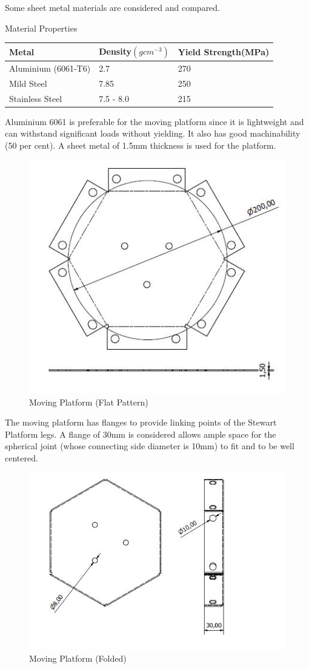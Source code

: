 Some sheet metal materials are considered and compared.
\begin{table}[!h]
	\caption[Sheet Metal Properties]{Material Properties}
\end{table}
\begin{center}
\centering
\begin{tabular}{|l|l|l|}
\hline
\textbf{Metal} & \textbf{Density$(gcm^{-3})$} & \textbf{Yield Strength(MPa)}\\
\hline
Aluminium (6061-T6)& 2.7 & 270\\
\hline
Mild Steel & 7.85 & 250\\
\hline
Stainless Steel & 7.5 - 8.0 & 215\\
\hline
\end{tabular}
\end{center}
Aluminium 6061 is preferable for the moving platform since it is lightweight and can withstand significant loads without yielding. It also has good machinability (50 per cent). A sheet metal of 1.5mm thickness is used for the platform.
\begin{center}
	\begin{figure}[H]
	\centering
	\includegraphics[width=0.6\linewidth]{Figures/Flat}
	\caption[Moving Platform]{Moving Platform (Flat Pattern)}
	\end{figure}
\end{center}

The moving platform has flanges to provide linking points of the Stewart Platform legs. A flange of 30mm is considered allows ample space for the spherical joint (whose connecting side diameter is 10mm) to fit and to be well centered.
\begin{center}
	\begin{figure}[H]
	\centering
	\includegraphics[width=0.6\linewidth]{Figures/Folded}
	\caption[Moving Platform]{Moving Platform (Folded)}
	\end{figure}
\end{center}

